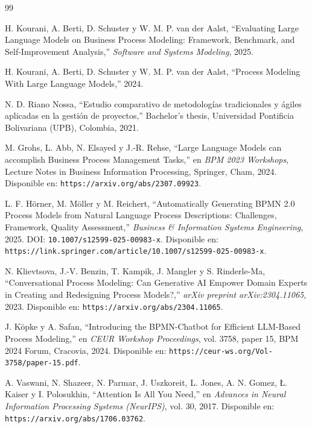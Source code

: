 \begin{thebibliography}{99}

H. Kourani, A. Berti, D. Schuster y W. M. P. van der Aalst, ``Evaluating Large Language Models on Business Process Modeling: Framework, Benchmark, and Self-Improvement Analysis,'' \textit{Software and Systems Modeling}, 2025.

H. Kourani, A. Berti, D. Schuster y W. M. P. van der Aalst, ``Process Modeling With Large Language Models,'' 2024.

N. D. Riano Nossa, ``Estudio comparativo de metodologías tradicionales y ágiles aplicadas en la gestión de proyectos,'' Bachelor's thesis, Universidad Pontificia Bolivariana (UPB), Colombia, 2021.

M. Grohs, L. Abb, N. Elsayed y J.-R. Rehse, ``Large Language Models can accomplish Business Process Management Tasks,'' en \textit{BPM 2023 Workshops}, Lecture Notes in Business Information Processing, Springer, Cham, 2024. Disponible en: \texttt{https://arxiv.org/abs/2307.09923}.

L. F. H\"orner, M. M\"oller y M. Reichert, ``Automatically Generating BPMN 2.0 Process Models from Natural Language Process Descriptions: Challenges, Framework, Quality Assessment,'' \textit{Business \& Information Systems Engineering}, 2025. DOI: \texttt{10.1007/s12599-025-00983-x}. Disponible en: \texttt{https://link.springer.com/article/10.1007/s12599-025-00983-x}.

N. Klievtsova, J.-V. Benzin, T. Kampik, J. Mangler y S. Rinderle-Ma, ``Conversational Process Modeling: Can Generative AI Empower Domain Experts in Creating and Redesigning Process Models?,'' \textit{arXiv preprint arXiv:2304.11065}, 2023. Disponible en: \texttt{https://arxiv.org/abs/2304.11065}.

J. Köpke y A. Safan, ``Introducing the BPMN-Chatbot for Efficient LLM-Based Process Modeling,'' en \textit{CEUR Workshop Proceedings}, vol. 3758, paper 15, BPM 2024 Forum, Cracovia, 2024. Disponible en: \texttt{https://ceur-ws.org/Vol-3758/paper-15.pdf}.

A. Vaswani, N. Shazeer, N. Parmar, J. Uszkoreit, L. Jones, A. N. Gomez, Ł. Kaiser y I. Polosukhin, ``Attention Is All You Need,'' en \textit{Advances in Neural Information Processing Systems (NeurIPS)}, vol. 30, 2017. Disponible en: \texttt{https://arxiv.org/abs/1706.03762}.


\end{thebibliography}
